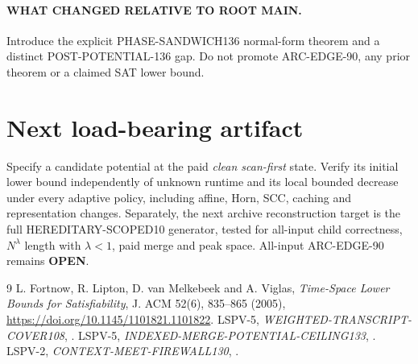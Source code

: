 \documentclass[11pt]{article}
\newcommand{\OPEN}{\textbf{OPEN}}
\begin{document}
\paragraph{WHAT CHANGED RELATIVE TO ROOT MAIN.}
Introduce the explicit PHASE-SANDWICH136
normal-form theorem and a distinct
POST-POTENTIAL-136 gap. Do not promote
ARC-EDGE-90, any prior theorem or
a claimed SAT lower bound.

\section{Next load-bearing artifact}
Specify a candidate potential at the paid
\emph{clean scan-first} state. Verify its
initial lower bound independently of
unknown runtime and its local bounded
decrease under every adaptive policy,
including affine, Horn, SCC, caching and
representation changes. Separately,
the next archive reconstruction target
is the full HEREDITARY-SCOPED10
generator, tested for all-input child
correctness, $N^\lambda$ length with
$\lambda<1$, paid merge and peak space.
All-input ARC-EDGE-90 remains \OPEN.

\begin{thebibliography}{9}\small
{} L. Fortnow, R. Lipton,
D. van Melkebeek and A. Viglas,
\emph{Time-Space Lower Bounds for Satisfiability},
J. ACM 52(6), 835--865 (2005),
\url{https://doi.org/10.1145/1101821.1101822}.
 LSPV-5,
\emph{WEIGHTED-TRANSCRIPT-COVER108},
.
 LSPV-5,
\emph{INDEXED-MERGE-POTENTIAL-CEILING133},
.
 LSPV-2,
\emph{CONTEXT-MEET-FIREWALL130},
.
\end{thebibliography}
\end{document}
